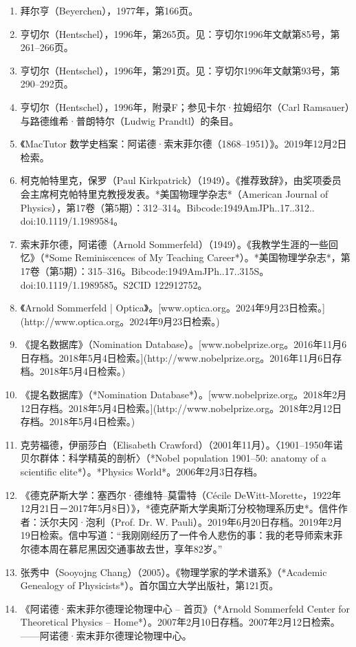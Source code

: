 \begin{enumerate}
\item 拜尔亨（Beyerchen），1977年，第166页。
\item 亨切尔（Hentschel），1996年，第265页。见：亨切尔1996年文献第85号，第261–266页。
\item 亨切尔（Hentschel），1996年，第291页。见：亨切尔1996年文献第93号，第290–292页。
\item 亨切尔（Hentschel），1996年，附录F；参见卡尔·拉姆绍尔（Carl Ramsauer）与路德维希·普朗特尔（Ludwig Prandtl）的条目。
\item 《MacTutor 数学史档案：阿诺德·索末菲尔德（1868–1951）》。2019年12月2日检索。
\item 柯克帕特里克，保罗（Paul Kirkpatrick）（1949）。《推荐致辞》，由奖项委员会主席柯克帕特里克教授发表。*美国物理学杂志*（American Journal of Physics），第17卷（第5期）：312–314。Bibcode:1949AmJPh..17..312.. doi:10.1119/1.1989584。
\item 索末菲尔德，阿诺德（Arnold Sommerfeld）（1949）。《我教学生涯的一些回忆》（*Some Reminiscences of My Teaching Career*）。*美国物理学杂志*，第17卷（第5期）：315–316。Bibcode:1949AmJPh..17..315S。doi:10.1119/1.1989585。S2CID 122912752。
\item 《Arnold Sommerfeld | Optica》。[www.optica.org。2024年9月23日检索。](http://www.optica.org。2024年9月23日检索。)
\item 《提名数据库》（Nomination Database）。[www.nobelprize.org。2016年11月6日存档。2018年5月4日检索。](http://www.nobelprize.org。2016年11月6日存档。2018年5月4日检索。)

\item 《提名数据库》（*Nomination Database*）。[www.nobelprize.org。2018年2月12日存档。2018年5月4日检索。](http://www.nobelprize.org。2018年2月12日存档。2018年5月4日检索。)
\item 克劳福德，伊丽莎白（Elisabeth Crawford）（2001年11月）。〈1901–1950年诺贝尔群体：科学精英的剖析〉（*Nobel population 1901–50: anatomy of a scientific elite*）。*Physics World*。2006年2月3日存档。
\item 《德克萨斯大学：塞西尔·德维特–莫雷特（Cécile DeWitt-Morette，1922年12月21日－2017年5月8日）》，*德克萨斯大学奥斯汀分校物理系历史*。信件作者：沃尔夫冈·泡利（Prof. Dr. W. Pauli）。2019年6月20日存档。2019年2月19日检索。信中写道：“我刚刚经历了一件令人悲伤的事：我的老导师索末菲尔德本周在慕尼黑因交通事故去世，享年82岁。”
\item 张秀中（Sooyojng Chang）（2005）。《物理学家的学术谱系》（*Academic Genealogy of Physicists*）。首尔国立大学出版社，第121页。
\item 《阿诺德·索末菲尔德理论物理中心 – 首页》（*Arnold Sommerfeld Center for Theoretical Physics – Home*）。2007年2月10日存档。2007年2月12日检索。——阿诺德·索末菲尔德理论物理中心。
\end{enumerate}
